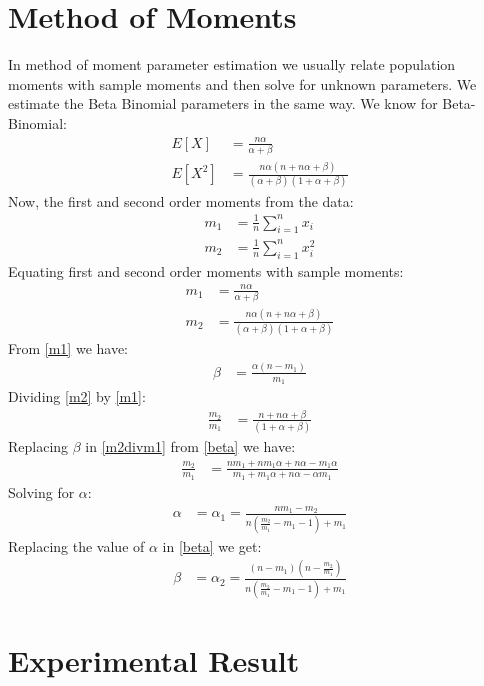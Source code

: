 \documentclass{article} %
\newcommand{\?}{\stackrel{?}{=}}
\begin{document}
\section{Method of Moments} \label{MOM}
In method of moment parameter estimation we usually relate population moments with sample moments and then solve for unknown parameters. We estimate the Beta Binomial parameters in the same way. We know for Beta-Binomial:
\begin{align}
E[X] &= \frac{n\alpha}{\alpha+\beta}\\
E[X^2] &= \frac{n\alpha(n+n\alpha+\beta)}{(\alpha+\beta)(1+\alpha+\beta)}
\end{align}
Now, the first and second order moments from the data:\\
\begin{align}
m_1&=\frac{1}{n}\sum\limits_{i=1}^{n}x_i\\
m_2&=\frac{1}{n}\sum\limits_{i=1}^{n}x_i^2
\end{align}
Equating first and second order moments with sample moments:
\begin{align}
m_1 &= \frac{n\alpha}{\alpha+\beta}\label{m1}\\
m_2 &= \frac{n\alpha(n+n\alpha+\beta)}{(\alpha+\beta)(1+\alpha+\beta)}\label{m2}
\end{align}
From \ref{m1} we have:
\begin{align}
\beta&=\frac{\alpha(n-m_1)}{m_1}\label{beta}
\end{align}
Dividing \ref{m2} by \ref{m1}:
\begin{align}
\frac{m_2}{m_1}&=\frac{n+n\alpha+\beta}{(1+\alpha+\beta)}\label{m2divm1}
\end{align}
Replacing $\beta$ in \ref{m2divm1} from \ref{beta} we have:
\begin{align}
\frac{m_2}{m_1}&=\frac{nm_1+nm_1\alpha+n\alpha-m_1\alpha}{m_1+m_1\alpha+n\alpha-\alpha m_1}\label{repBeta}
\end{align}
Solving for $\alpha$:
\begin{align}
\alpha&=\alpha_1 = \frac{nm_1-m_2}{n(\frac{m_2}{m_1}-m_1-1)+m_1}
\end{align}
Replacing the value of $\alpha$ in \ref{beta} we get:
\begin{align}
\beta &= \alpha_2 = \frac{(n-m_1)(n-\frac{m_2}{m_1})}{n(\frac{m_2}{m_1}-m_1-1)+m_1}
\end{align}


\section{Experimental Result}

\end{document}
